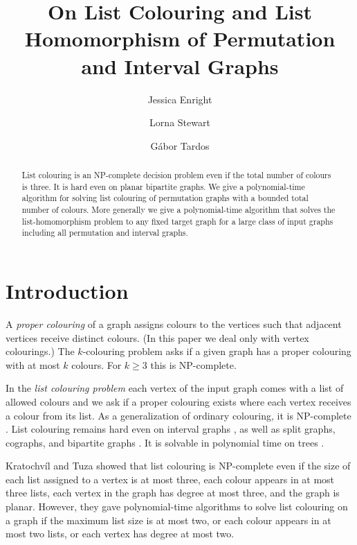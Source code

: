 \documentclass[12pt]{llncs}
\title{On List Colouring and List Homomorphism of Permutation and Interval Graphs}
\author{Jessica Enright  \inst{1} \and Lorna Stewart \inst{1} \and G\'{a}bor Tardos \inst{2}}
\institute{University of Alberta\\ \and Simon Fraser University and R\'enyi Institute }
\date{}
\begin{document}
\newenvironment{my_enumerate}{
\begin{enumerate}
  \setlength{\itemsep}{1pt}
  \setlength{\parskip}{0pt}
  \setlength{\parsep}{0pt}}
  {\end{enumerate}
}
\newenvironment{my_itemize}{
\begin{itemize}
  \setlength{\itemsep}{1pt}
  \setlength{\parskip}{0pt}
  \setlength{\parsep}{0pt}}
  {\end{itemize}
}
\newenvironment{my_proof}{   
\begin{proof} 
     }
     { $\Box$ \end{proof}
}

\maketitle

\begin{abstract}
List colouring is an NP-complete decision problem even if the total number of
colours is three.  It is hard even on planar bipartite graphs.  We give a
polynomial-time algorithm for solving list colouring of permutation graphs
with a bounded total number of colours. More generally we give a
polynomial-time algorithm that solves the list-homomorphism problem to any
fixed target graph for a large class of input graphs including all permutation
and interval graphs.
\end{abstract}

\section{Introduction}
A {\em proper colouring} of a graph assigns colours to the vertices such that adjacent vertices receive distinct colours. (In this paper we deal only with vertex colourings.) The {$k$-colouring problem} asks if a given graph has a proper colouring with at most $k$ colours. For $k\ge3$ this is NP-complete. 

In the {\em list colouring problem} each vertex of the input graph comes with a list of allowed colours and we ask if a proper colouring exists where each vertex receives a colour from its list. As a generalization of ordinary colouring, it is NP-complete \cite{toft}.  List colouring remains hard even on interval graphs \cite{biro1992}, as well as split graphs, cographs, and bipartite graphs \cite{jansenScheffler}.  It is solvable in polynomial time on trees \cite{jansenScheffler}.

Kratochv\'il and Tuza \cite{kratochvilTuza} showed that list colouring is NP-complete even if the size of each list assigned to a vertex is at most three, each colour appears in at most three lists, each vertex in the graph has degree at most three, and the graph is planar.  However, they gave polynomial-time algorithms to solve list colouring on a graph if the maximum list size is at most two, or each colour appears in at most two lists, or each vertex has degree at most two.
\end{document}
